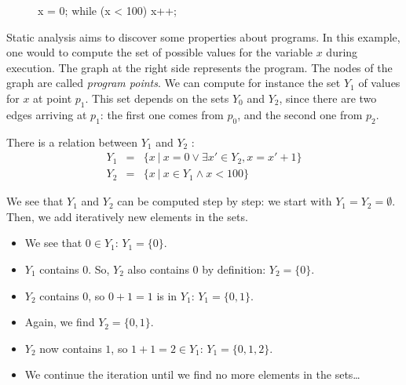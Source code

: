 \documentclass[a4paper,english,titlepage,11pt]{article}
\begin{document}
\begin{figure}[!h]
   \begin{minipage}[c]{.46\linewidth}
\begin{C}
x = 0;
while (x < 100) {
	x++;
}
\end{C}
   \end{minipage} \hfill
   \begin{minipage}[c]{.46\linewidth}
   \end{minipage}
\end{figure}
\FloatBarrier

Static analysis aims to discover some properties about programs. In this
example, one would to compute the set of possible values for the variable $x$
during execution.
The graph at the right side represents the program. The nodes of the graph are
called \emph{program points}. We can compute for instance the set $Y_1$ of
values for $x$ at point $p_1$. This set depends on the sets $Y_0$ and $Y_2$,
since there are two edges arriving at $p_1$: the first one comes from $p_0$, and
the second one from $p_2$.

There is a relation between $Y_1$ and $Y_2$ :
\begin{eqnarray*}
Y_1 &=& \{x\ |\ x=0 \vee \exists x' \in Y_2, x=x'+1 \} \\
Y_2 &=& \{x\ |\ x \in Y_1 \wedge x < 100 \}
\end{eqnarray*}

We see that $Y_1$ and $Y_2$ can be computed step by step:
we start with $Y_1 = Y_2 = \emptyset$.
Then, we add iteratively new elements in the sets.
\begin{itemize}
\item  We see that $0 \in Y_1$: $Y_1 = \{0\}$.
\item $Y_1$ contains $0$. So, $Y_2$ also contains $0$ by definition: $Y_2 =
\{0\}$.
\item $Y_2$ contains $0$, so $0+1=1$ is in $Y_1$: $Y_1 = \{0,1\}$.
\item Again, we find $Y_2 = \{0,1\}$.
\item $Y_2$ now contains $1$, so $1+1=2 \in Y_1$: $Y_1 = \{0,1,2\}$.
\item We continue the iteration until we find no more elements in the sets\dots
\end{itemize}
\end{document}
